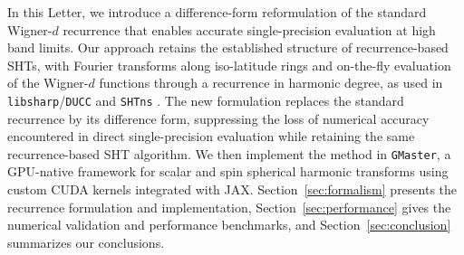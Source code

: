 \documentclass[letters,usenatbib,useAMS]{mnras}
\begin{document}


In this Letter, we introduce a difference-form reformulation of the standard Wigner-$d$ recurrence that enables accurate single-precision evaluation at high band limits. Our approach retains the established structure of recurrence-based SHTs, with Fourier transforms along iso-latitude rings and on-the-fly evaluation of the Wigner-$d$ functions through a recurrence in harmonic degree, as used in \texttt{libsharp}/\texttt{DUCC} and \texttt{SHTns} \citep{reinecke2013,schaeffer2013,ishioka2018}. The new formulation replaces the standard recurrence by its difference form, suppressing the loss of numerical accuracy encountered in direct single-precision evaluation while retaining the same recurrence-based SHT algorithm. We then implement the method in \texttt{GMaster}, a GPU-native framework for scalar and spin spherical harmonic transforms using custom CUDA kernels integrated with JAX. Section~\ref{sec:formalism} presents the recurrence formulation and implementation, Section~\ref{sec:performance} gives the numerical validation and performance benchmarks, and Section~\ref{sec:conclusion} summarizes our conclusions.




\end{document}
